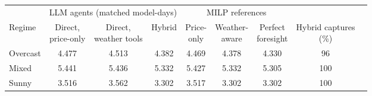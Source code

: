 \begin{tabular}{lcccccccc}
\toprule
 & \multicolumn{3}{c}{LLM agents (matched model-days)} & \multicolumn{3}{c}{MILP references} & \\
\cmidrule(lr){2-4}\cmidrule(lr){5-7}
Regime & \makecell{Direct,\\price-only} & \makecell{Direct,\\weather tools} & Hybrid & \makecell{Price-\\only} & \makecell{Weather-\\aware} & \makecell{Perfect\\foresight} & \makecell{Hybrid captures\\(\%)} \\
\midrule
Overcast & 4.477 & 4.513 & 4.382 & 4.469 & 4.378 & 4.330 & 96 \\
Mixed & 5.441 & 5.436 & 5.332 & 5.427 & 5.332 & 5.305 & 100 \\
Sunny & 3.516 & 3.562 & 3.302 & 3.517 & 3.302 & 3.302 & 100 \\
\bottomrule
\end{tabular}
